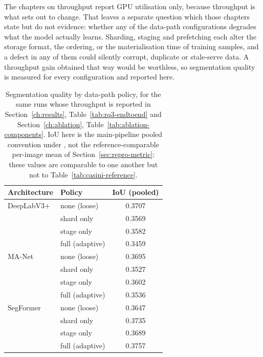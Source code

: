 The chapters on throughput report GPU utilisation only, because throughput is
what \pads{} sets out to change. That leaves a separate question which those
chapters state but do not evidence: whether any of the data-path configurations
degrades what the model actually learns. Sharding, staging and prefetching each
alter the storage format, the ordering, or the materialisation time of training
samples, and a defect in any of them could silently corrupt, duplicate or
stale-serve data. A throughput gain obtained that way would be worthless, so
segmentation quality is measured for every configuration and reported here.

\begin{table}[!ht]
\centering
\begin{tabular}{llc}
\toprule
Architecture & Policy & IoU (pooled) \\
\midrule
DeepLabV3+ & none (loose)            & 0.3707 \\
           & shard only              & 0.3569 \\
           & stage only              & 0.3582 \\
           & full \pads{} (adaptive) & 0.3459 \\
\midrule
MA-Net     & none (loose)            & 0.3695 \\
           & shard only              & 0.3527 \\
           & stage only              & 0.3602 \\
           & full \pads{} (adaptive) & 0.3536 \\
\midrule
SegFormer  & none (loose)            & 0.3647 \\
           & shard only              & 0.3735 \\
           & stage only              & 0.3689 \\
           & full \pads{} (adaptive) & 0.3757 \\
\bottomrule
\end{tabular}
\caption[Segmentation quality by data-path policy]{Segmentation quality by data-path policy, for the same runs whose
throughput is reported in Section~\ref{ch:results},
Table~\ref{tab:rq3-endtoend} and Section~\ref{ch:ablation},
Table~\ref{tab:ablation-components}. IoU here is the main-pipeline pooled
convention under , not the
reference-comparable per-image mean of Section~\ref{sec:repro-metric}: these
values are comparable to one another but not to
Table~\ref{tab:casini-reference}.}
\label{tab:accuracy-guardrail}
\end{table}

